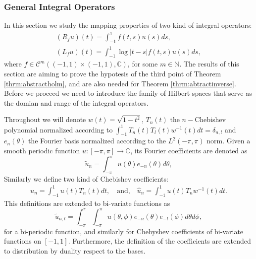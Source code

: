 \documentclass{article}
\newcommand{\IC}{{\mathbb C}}
\newcommand{\IN}{{\mathbb N}}
\newcommand{\cmspace}[3]{\mathcal{C}^{#1} \left( #2, #3 \right)}
\begin{document}
\subsubsection{General Integral Operators}
\label{sec:IntegralOperators}
In this section we study the mapping properties of two kind of integral operators: 
\begin{align*}
(R_f u)(t) = \int_{-1}^1f(t,s) u(s) ds,\\
(L_fu)(t) = \int_{-1}^1 \log|t-s| f(t,s) u(s) ds,
\end{align*}
where $f \in \cmspace{m}{(-1,1)\times(-1,1)}{\IC}$, for some $m \in \IN$. The results of this section are aiming to prove the hypotesis of the third point of Theorem \ref{thrm:abstractholm}, and are also needed for Theorem \ref{thrm:abtractinverse}. Before we proceed we need to introduce the family of Hilbert spaces that serve as the domian and range of the integral operators. 

Throughout we will denote $w(t) = \sqrt{1-t^2}$, $T_n(t)$ the $n-$Chebishev polynomial normalized according to $\int_{-1}^1 T_n(t) T_l(t) w^{-1}(t) dt = \delta_{n,l}$ and $e_n(\theta)$ the Fourier basis normalized according to the $L^2(-\pi,\pi)$ norm. 
Given a smooth periodic function $u :[-\pi,\pi] \rightarrow \IC$, its Fourier coefficients are denoted as
$$
\widetilde{u}_n = \int_{-\pi}^\pi u(\theta) e_{-n}(\theta) d\theta, 
$$
Similarly we define two kind of Chebishev coefficients:
\begin{align*}
u_n = \int_{-1}^{1} u(t) T_n(t) dt, \quad \text{and,} \quad  \widehat{u}_n = \int_{-1}^1 u(t) T_n w^{-1}(t)dt.
\end{align*}
This definitions are extended to bi-variate functions as 
$$\widetilde{u}_{n,l} = \int_{-\pi}^{\pi}\int_{-\pi}^\pi u(\theta,\phi) e_{-n}(\theta)e_{-l}(\phi) d\theta d\phi,$$
for a bi-periodic function, and similarly  for Chebyshev coefficients of  bi-variate functions on $[-1,1]$. Furthermore, the definition of the coefficients are extended to distribution by duality respect to the bases. 
\end{document}
